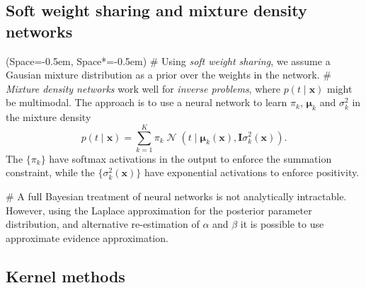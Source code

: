 \documentclass[12pt, a4paper]{article}
\newcommand{\listSpace}{-0.5em}%
\newcommand{\vect}[1]{\bm{#1}}
\DeclareMathOperator{\N}{\mathcal{N}}
\begin{document}
\subsection*{Soft weight sharing and mixture density networks}
\begin{easylist}[itemize]
	\ListProperties(Space=\listSpace, Space*=\listSpace)
	# Using \emph{soft weight sharing}, we assume a Gausian mixture distribution as a prior over the weights in the network.
	# \emph{Mixture density networks} work well for \emph{inverse problems}, where $p(t \mid \vect{x})$ might be multimodal.
	The approach is to use a neural network to learn $\pi_k$, $\vect{\mu}_k$ and $\sigma_k^2$ in the mixture density
	\begin{equation*}
		p(t \mid \vect{x}) = \sum_{k=1}^{K} \pi_k 
		\N \left( t \mid \vect{\mu}_k(\vect{x}), \vect{I} \sigma^2_k(\vect{x}) \right).
	\end{equation*}
	The $\{\pi_k\}$ have softmax activations in the output to enforce the summation constraint, while the $\{ \sigma^2_k(\vect{x}) \}$ have exponential activations to enforce positivity.
	
	# A full Bayesian treatment of neural networks is not analytically intractable.
	However, using the Laplace approximation for the posterior parameter distribution, and alternative re-estimation of $\alpha$ and $\beta$ it is possible to use approximate evidence approximation.
\end{easylist}



\subsection{Kernel methods}
\end{document}
